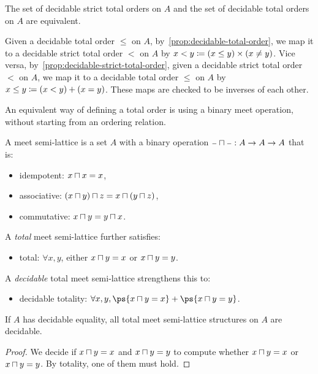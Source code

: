 \begin{proposition}
    \label{prop:decidable-strict-total-order-equiv}
    The set of decidable strict total orders on $A$ and the set of decidable total orders on $A$ are equivalent.
\end{proposition}
\begin{proofsketch}
    Given a decidable total order $\leq$ on $A$, by~\cref{prop:decidable-total-order},
    we map it to a decidable strict total order $<$ on $A$ by
    $x < y \mathrel{\coloneq} (x \leq y) \times (x \neq y)$.
    Vice versa, by~\cref{prop:decidable-strict-total-order},
    given a decidable strict total order $<$ on $A$,
    we map it to a decidable total order $\leq$ on $A$ by
    $x \leq y \mathrel{\coloneq} (x < y) + (x = y)$.
    These maps are checked to be inverses of each other.
\end{proofsketch}
%
An equivalent way of defining a total order is using a binary meet operation, without starting from an ordering relation.
\begin{definition}
    \label{def:meet-semi-lattice}
    A meet semi-lattice is a set $A$ with a binary operation $\blank\meet\blank : A \to A \to A$ that is:
    \begin{itemize}
        \item idempotent: $x \meet x \id x$,
        \item associative: $(x \meet y) \meet z \id x \meet (y \meet z)$,
        \item commutative: $x \meet y \id y \meet x$.
    \end{itemize}
    A \emph{total} meet semi-lattice further satisfies:
    \begin{itemize}
        \item total: $\forall x, y$, either $x \meet y \id x$ or $x \meet y \id y$.
    \end{itemize}
    A \emph{decidable} total meet semi-lattice strengthens this to:
    \begin{itemize}
        \item decidable totality: ${\forall x, y}, \ps{x \meet y \id x} + \ps{x \meet y \id y}$.
    \end{itemize}
\end{definition}

\begin{proposition}
    \label{prop:discrete-meet-semi-lattice}
    If $A$ has decidable equality, all total meet semi-lattice structures on $A$ are decidable.
\end{proposition}
\begin{proof}
    We decide if $x \meet y \id x$ and $x \meet y \id y$ to compute whether
    $x \meet y \id x$ or $x \meet y \id y$. By totality, one of them must hold.
\end{proof}

